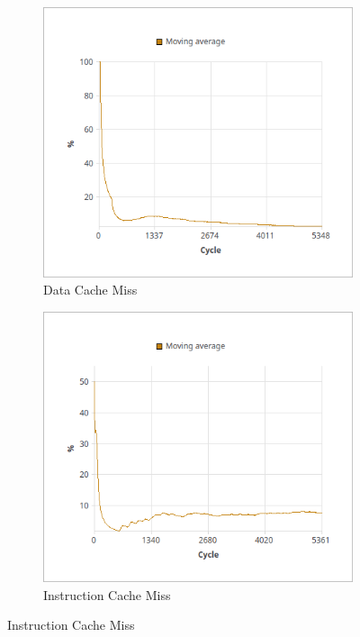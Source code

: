\documentclass[a4paper,12pt]{article}
\begin{document}
\begin{figure}[h]
  \centering
  \begin{subfigure}[b]{0.45\textwidth}
    \centering
    \includegraphics[width=\textwidth]{assets/data_cache_miss.png}
    \caption{Data Cache Miss}
    \label{fig:data_cache_miss}
  \end{subfigure}
  \hfill
  \begin{subfigure}[b]{0.45\textwidth}
    \centering
    \includegraphics[width=\textwidth]{assets/instruction_cache_miss.png}
    \caption{Instruction Cache Miss}
    \label{fig:instruction_cache_miss}
  \end{subfigure}
\end{figure}
\end{document}
